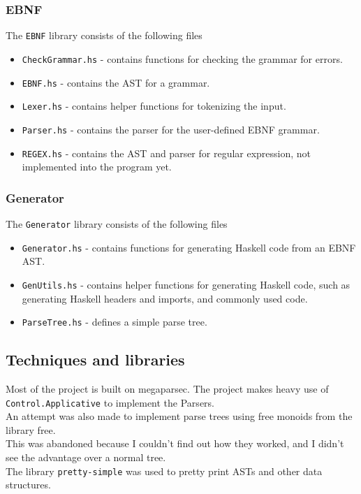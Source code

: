 \documentclass{article}
\begin{document}
\subsubsection*{EBNF}
The \texttt{EBNF} library consists of the following files
\begin{itemize}
    \item \texttt{CheckGrammar.hs} - contains functions for checking the grammar for errors.
    \item \texttt{EBNF.hs} - contains the AST for a grammar.
    \item \texttt{Lexer.hs} - contains helper functions for tokenizing the input.
    \item \texttt{Parser.hs} - contains the parser for the user-defined EBNF grammar.
    \item \texttt{REGEX.hs} - contains the AST and parser for regular expression, not implemented into the program yet.
\end{itemize}


\subsubsection*{Generator}
The \texttt{Generator} library consists of the following files
\begin{itemize}
    \item \texttt{Generator.hs} - contains functions for generating Haskell code from an EBNF AST.
    \item \texttt{GenUtils.hs} - contains helper functions for generating Haskell code, such as generating Haskell headers and imports, and commonly used code.
    \item \texttt{ParseTree.hs} - defines a simple parse tree. 
\end{itemize}

\subsection*{Techniques and libraries}
Most of the project is built on megaparsec.
The project makes heavy use of \texttt{Control.Applicative} to implement the Parsers.\\
An attempt was also made to implement parse trees using free monoids from the library free\cite{free}. \\
This was abandoned because I couldn't find out how they worked, and I didn't see the advantage over a normal tree.\\
The library \texttt{pretty-simple} was used to pretty print ASTs and other data structures\cite{pretty}.
\end{document}
